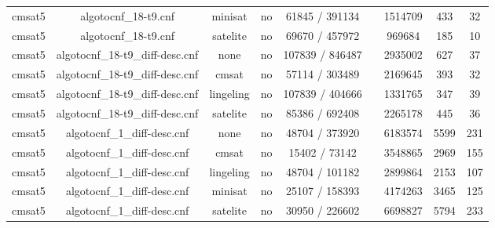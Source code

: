 \begin{appendices}
\begin{table}[p]
\begin{center}
\begin{tabular}{l|cccccccc}
  cmsat5                         & algotocnf\_18-t9.cnf           & minisat    & no    & 61845 / 391134 &           & 1514709   & 433        & 32 \\ %
  cmsat5                         & algotocnf\_18-t9.cnf           & satelite   & no    & 69670 / 457972 &           & 969684    & 185        & 10 \\ %
  cmsat5                         & algotocnf\_18-t9\_diff-desc.cnf & none       & no    & 107839 / 846487 &           & 2935002   & 627        & 37 \\ %
  cmsat5                         & algotocnf\_18-t9\_diff-desc.cnf & cmsat      & no    & 57114 / 303489 &           & 2169645   & 393        & 32 \\ %
  cmsat5                         & algotocnf\_18-t9\_diff-desc.cnf & lingeling  & no    & 107839 / 404666 &           & 1331765   & 347        & 39 \\ %
  cmsat5                         & algotocnf\_18-t9\_diff-desc.cnf & satelite   & no    & 85386 / 692408 &           & 2265178   & 445        & 36 \\ %
  cmsat5                         & algotocnf\_1\_diff-desc.cnf    & none       & no    & 48704 / 373920 &           & 6183574   & 5599       & 231 \\ %
  cmsat5                         & algotocnf\_1\_diff-desc.cnf    & cmsat      & no    & 15402 / 73142 &           & 3548865   & 2969       & 155 \\ %
  cmsat5                         & algotocnf\_1\_diff-desc.cnf    & lingeling  & no    & 48704 / 101182 &           & 2899864   & 2153       & 107 \\ %
  cmsat5                         & algotocnf\_1\_diff-desc.cnf    & minisat    & no    & 25107 / 158393 &           & 4174263   & 3465       & 125 \\ %
  cmsat5                         & algotocnf\_1\_diff-desc.cnf    & satelite   & no    & 30950 / 226602 &           & 6698827   & 5794       & 233 \\ %

\end{tabular}
\end{center}
\end{table}
\end{appendices}
